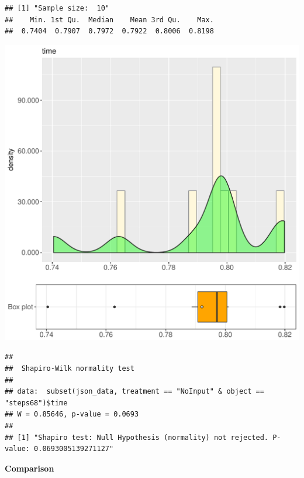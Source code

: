 \documentclass{article}\usepackage[]{graphicx}\usepackage[]{color}
\makeatletter
\def\maxwidth{ %
  \ifdim\Gin@nat@width>\linewidth
    \linewidth
  \else
    \Gin@nat@width
  \fi
}
\newenvironment{kframe}{%
 \def\at@end@of@kframe{}%
 \ifinner\ifhmode%
  \def\at@end@of@kframe{\end{minipage}}%
  \begin{minipage}{\columnwidth}%
 \fi\fi%
 \def\FrameCommand##1{\hskip\@totalleftmargin \hskip-\fboxsep
 \colorbox{shadecolor}{##1}\hskip-\fboxsep
     \hskip-\linewidth \hskip-\@totalleftmargin \hskip\columnwidth}%
 \MakeFramed {\advance\hsize-\width
   \@totalleftmargin\z@ \linewidth\hsize
   \@setminipage}}%
 {\par\unskip\endMakeFramed%
 \at@end@of@kframe}
\newenvironment{knitrout}{}{} %
\makeatother
\begin{document}
\begin{knitrout}
\color{fgcolor}\begin{kframe}
\begin{verbatim}
## [1] "Sample size:  10"
##    Min. 1st Qu.  Median    Mean 3rd Qu.    Max. 
##  0.7404  0.7907  0.7972  0.7922  0.8006  0.8198
\end{verbatim}
\end{kframe}
\includegraphics[width=\maxwidth]{figure/RH4_NoInput_steps68-1} 
\begin{kframe}\begin{verbatim}
## 
## 	Shapiro-Wilk normality test
## 
## data:  subset(json_data, treatment == "NoInput" & object == "steps68")$time
## W = 0.85646, p-value = 0.0693
## 
## [1] "Shapiro test: Null Hypothesis (normality) not rejected. P-value: 0.0693005139271127"
\end{verbatim}
\end{kframe}
\end{knitrout}
  
 \textbf{Comparison}
  
\end{document}
